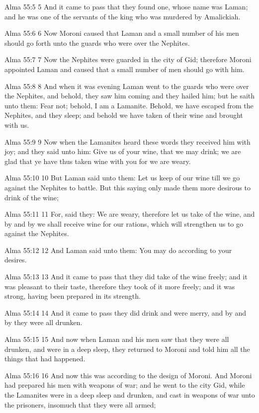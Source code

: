 Alma 55:5
 5 And it came to pass that they found one, whose name was Laman;
and he was one of the servants of the king who was murdered by
Amalickiah.

Alma 55:6
 6 Now Moroni caused that Laman and a small number of his men
should go forth unto the guards who were over the Nephites.

Alma 55:7
 7 Now the Nephites were guarded in the city of Gid; therefore
Moroni appointed Laman and caused that a small number of men
should go with him.

Alma 55:8
 8 And when it was evening Laman went to the guards who were over
the Nephites, and behold, they saw him coming and they hailed
him; but he saith unto them: Fear not; behold, I am a Lamanite.
Behold, we have escaped from the Nephites, and they sleep; and
behold we have taken of their wine and brought with us.

Alma 55:9
 9 Now when the Lamanites heard these words they received him
with joy; and they said unto him: Give us of your wine, that we
may drink; we are glad that ye have thus taken wine with you for
we are weary.

Alma 55:10
 10 But Laman said unto them: Let us keep of our wine till we go
against the Nephites to battle. But this saying only made them
more desirous to drink of the wine;

Alma 55:11
 11 For, said they: We are weary, therefore let us take of the
wine, and by and by we shall receive wine for our rations, which
will strengthen us to go against the Nephites.

Alma 55:12
 12 And Laman said unto them: You may do according to your
desires.

Alma 55:13
 13 And it came to pass that they did take of the wine freely;
and it was pleasant to their taste, therefore they took of it
more freely; and it was strong, having been prepared in its
strength.

Alma 55:14
 14 And it came to pass they did drink and were merry, and by and
by they were all drunken.

Alma 55:15
 15 And now when Laman and his men saw that they were all
drunken, and were in a deep sleep, they returned to Moroni and
told him all the things that had happened.

Alma 55:16
 16 And now this was according to the design of Moroni. And
Moroni had prepared his men with weapons of war; and he went to
the city Gid, while the Lamanites were in a deep sleep and
drunken, and cast in weapons of war unto the prisoners, insomuch
that they were all armed;

